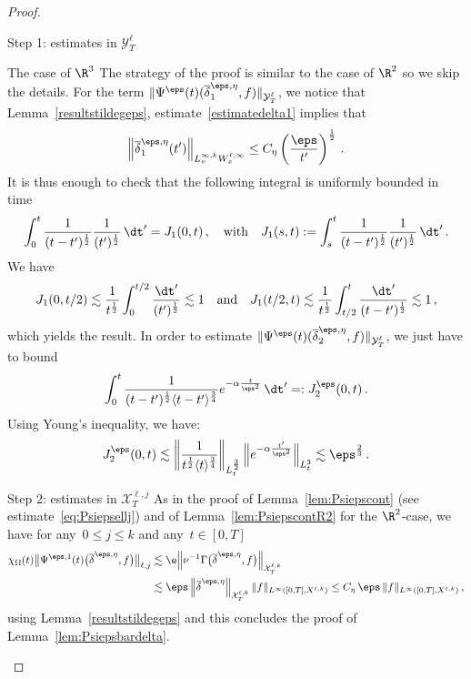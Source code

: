 \begin{proof}
\begin{step}{Step 1: estimates in $\mathcal{Y}^\ell_T$}
\begin{step}{The case of $\R^3$}
The strategy of the proof is similar to the case of $\R^2$ so we skip the details. For the term $\|\Psi^\eps(t) (\overline \delta^{\eps,\eta}_1, f)\|_{\mathcal{Y}^\ell_T}$, we notice that Lemma~\ref{resultstildegeps}, estimate~\eqref{estimatedelta1} implies that
\[
\left\|\overline \delta^{\eps,\eta}_1(t')\right\|_{L^{\infty,k}_v W^{\ell,\infty}_x} \le C_\eta \left(\frac{\eps}{t'}\right)^\frac12 \,.
\]
It is thus enough to check that the following integral is uniformly bounded in time
\[
\int_0^t \frac{1}{(t-t')^\frac12} \frac{1}{(t')^\frac12} \, \dt' =J_1(0,t)\,, \quad \text{with} \quad J_1(s,t):=\int_s^t \frac{1}{(t-t')^\frac12} \frac{1}{(t')^\frac12} \, \dt' \,.
\]
We have
\[
J_1(0,t/2) \lesssim \frac{1}{t^\frac12} \int_0^{t/2} \frac{\dt'}{(t')^\frac12} \lesssim 1
\quad \text{and} \quad J_1(t/2,t) \lesssim \frac{1}{t^\frac12} \int_{t/2}^t \frac{\dt'}{(t-t')^\frac12} \lesssim 1 \,,
\]
which yields the result. In order to estimate $\|\Psi^\eps(t) (\overline \delta^{\eps,\eta}_2, f)\|_{\mathcal{Y}^\ell_T}$, we just have to bound
\[
\int_0^t \frac{1}{{(t-t')^\frac12 \langle t-t' \rangle^\frac34}} e^{- \alpha \frac{t}{\eps^2}} \, \dt' =: J_2^\eps(0,t) \,.
\]
Using Young's inequality, we have:
\[
J_2^\eps(0,t) \lesssim \left\| \frac{1}{{t^{\frac12} \langle t \rangle^{\frac34}}}\right\|_{L^{\frac32}_t}\Big\|e^{- \alpha \frac{t'}{\eps^2}}\Big\|_{L^3_t} \lesssim \eps^{\frac23} \,.
\]
\end{step}
\end{step}

\begin{laststep}{Step 2: estimates in $\mathcal{X}^{\ell,j}_T$}
As in the proof of Lemma~\ref{lem:Psiepscont} (see estimate~\eqref{eq:Psiepsellj}) and of Lemma~\ref{lem:PsiepscontR2} for the $\R^2$-case, we have for any~$0 \le j \le k$ and any~$t\in [0,T]$
\begin{align*}
\chi_\Omega(t)\big\|\Psi^{\eps,1}(t)\big(\overline\delta^{\eps,\eta},f\big)\big\|_{{\ell,j}}
 &\lesssim \e \Big \| \nu^{-1} \Gamma\big(\overline\delta^{\eps,\eta},f\big) \Big\|_{\mathcal{X}_T^{\ell,k} } \\
&\lesssim \eps \left\|\overline\delta^{\eps,\eta}\right\|_{\mathcal{X}^{\ell,k}_T} \|f\|_{L^\infty([0,T],X^{\ell,k})}
\le C_\eta \, \eps \, \|f\|_{L^\infty([0,T],X^{\ell,k})}\,,
\end{align*}
using Lemma~\ref{resultstildegeps} and this concludes the proof of Lemma~\ref{lem:Psiepsbardelta}.
\end{laststep}
\let\qed\relax
\end{proof}


